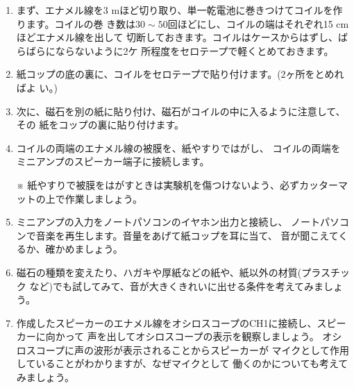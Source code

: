 \begin{enumerate}

\item まず、エナメル線を3 mほど切り取り、単一乾電池に巻きつけてコイルを作ります。コイルの巻
き数は$30\sim 50$回ほどにし、コイルの端はそれぞれ15 cmほどエナメル線を出して
切断しておきます。コイルはケースからはずし、ばらばらにならないように2ケ
所程度をセロテープで軽くとめておきます。

\item 紙コップの底の裏に、コイルをセロテープで貼り付けます。(2ヶ所をとめればよ 
い。)

\item 次に、磁石を別の紙に貼り付け、磁石がコイルの中に入るように注意して、その
紙をコップの裏に貼り付けます。

\item コイルの両端のエナメル線の被膜を、紙やすりではがし、
コイルの両端をミニアンプのスピーカー端子に接続します。

※ 紙やすりで被膜をはがすときは実験机を傷つけないよう、必ずカッターマットの上で作業しましょう。


\item ミニアンプの入力をノートパソコンのイヤホン出力と接続し、
ノートパソコンで音楽を再生します。音量をあげて紙コップを耳に当て、
音が聞こえてくるか、確かめましょう。

\item 磁石の種類を変えたり、ハガキや厚紙などの紙や、紙以外の材質(プラスチック
など)でも試してみて、音が大きくきれいに出せる条件を考えてみましょう。

\item 作成したスピーカーのエナメル線をオシロスコープのCH1に接続し、スピーカーに向かって
声を出してオシロスコープの表示を観察しましょう。
オシロスコープに声の波形が表示されることからスピーカーが
マイクとして作用していることがわかりますが、なぜマイクとして
働くのかについても考えてみましょう。



\end{enumerate}



\newpage


